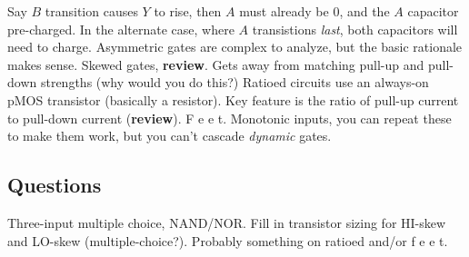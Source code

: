 \documentclass{article}
\begin{document}
Say \(B\) transition causes \(Y\) to rise, then \(A\) must already be \(0\), and the \(A\) capacitor pre-charged. In the alternate case, where \(A\) transistions \textit{last}, both capacitors will need to charge. Asymmetric gates are complex to analyze, but the basic rationale makes sense. Skewed gates, \textbf{review}. Gets away from matching pull-up and pull-down strengths (why would you do this?) Ratioed circuits use an always-on pMOS transistor (basically a resistor). Key feature is the ratio of pull-up current to pull-down current (\textbf{review}). F e e t. Monotonic inputs, you can repeat these to make them work, but you can't cascade \textit{dynamic} gates.
\subsection{Questions}
Three-input multiple choice, NAND/NOR. Fill in transistor sizing for HI-skew and LO-skew (multiple-choice?). Probably something on ratioed and/or f e e t.
\end{document}
